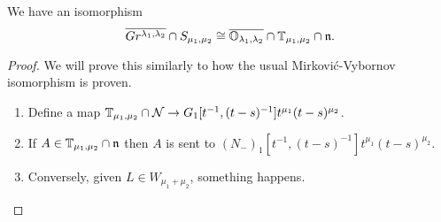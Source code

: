 \documentclass{article}
\begin{document}
\begin{theorem}
We have an isomorphism
\[
\overline{Gr^{\lambda_1, \lambda_2}} \cap S_{\mu_1, \mu_2} \cong
\overline{\mathbb O_{\lambda_1, \lambda_2}} \cap \mathbb T_{\mu_1, \mu_2} \cap \mathfrak n.
\]
\end{theorem}

\begin{proof}
We will prove this similarly to how the usual Mirkovi\'c-Vybornov isomorphism is proven.
\begin{enumerate}[label = Step \arabic*:]
    \item Define a map $\mathbb T_{\mu_1, \mu_2} \cap \mathcal N \rightarrow G_1[t^{-1}, (t-s)^{-1}] t^{\mu_1} (t-s)^{\mu_2}$.

    \item If $A \in \mathbb T_{\mu_1,\mu_2} \cap \mathfrak n$ then $A$ is sent to $(N_-)_1[t^{-1}, (t-s)^{-1}] t^{\mu_1} (t-s)^{\mu_2}$.

    \item Conversely, given $L \in W_{\mu_1 + \mu_2}$, something happens.
\end{enumerate}
\end{proof}
\end{document}
